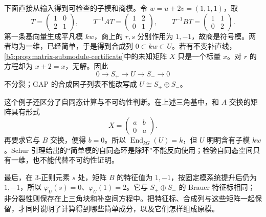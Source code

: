 \ProseParagraphBreak
下面直接从输入得到可检查的子模和商模。令 \(w=u+2v=(1,1,1)\)，取
\[
	T=\begin{pmatrix}1&0\\2&1\end{pmatrix},\qquad
	T^{-1}AT=\begin{pmatrix}1&2\\0&1\end{pmatrix},\qquad
	T^{-1}BT=\begin{pmatrix}1&1\\0&2\end{pmatrix}.
\]
第一条基向量生成平凡模 \(kw\)，商上的 \(r,s\) 分别作用为 \(1,-1\)，故商是符号模。两者均为一维，已经简单，于是得到合成列 \(0\subset kw\subset U\)。若有不变补直线，\cref{b5:prop:matrix-submodule-certificate}中的未知矩阵 \(X\) 只是一个标量 \(x\)。对 \(r\) 的方程却为 \(x+2=x\)，无解。因此
\[
	0\longrightarrow S_+\longrightarrow U\longrightarrow S_-\longrightarrow0
\]
不分裂；GAP 的合成因子列表不能改写成 \(U\cong S_+\oplus S_-\)。

\ProseParagraphBreak
这个例子还区分了自同态计算与不可约性判断。在上述三角基中，和 \(A\) 交换的矩阵具有形式
\[
	X=\begin{pmatrix}a&b\\0&a\end{pmatrix}.
\]
再要求它与 \(B\) 交换，便得 \(b=0\)。所以 \(\operatorname{End}_{kG}(U)=k\)，但 \(U\) 明明含有子模 \(kw\)。Schur 引理给出的“简单模的自同态环是除环”不能反向使用；检验自同态空间只有一维，也不能代替不可约性证明。

\ProseParagraphBreak
最后，在 \(3\)-正则元素 \(s\) 处，矩阵 \(B\) 的特征值为 \(1,-1\)，按固定模系统提升后仍为 \(1,-1\)，所以 \(\varphi_U(s)=0\)、\(\varphi_U(1)=2\)。它与 \(S_+\oplus S_-\) 的 Brauer 特征标相同；非分裂性则保存在上三角块和补空间方程中。把特征标、合成列与这些矩阵一起保留，才同时说明了计算得到哪些简单成分，以及它们怎样组成原模。
